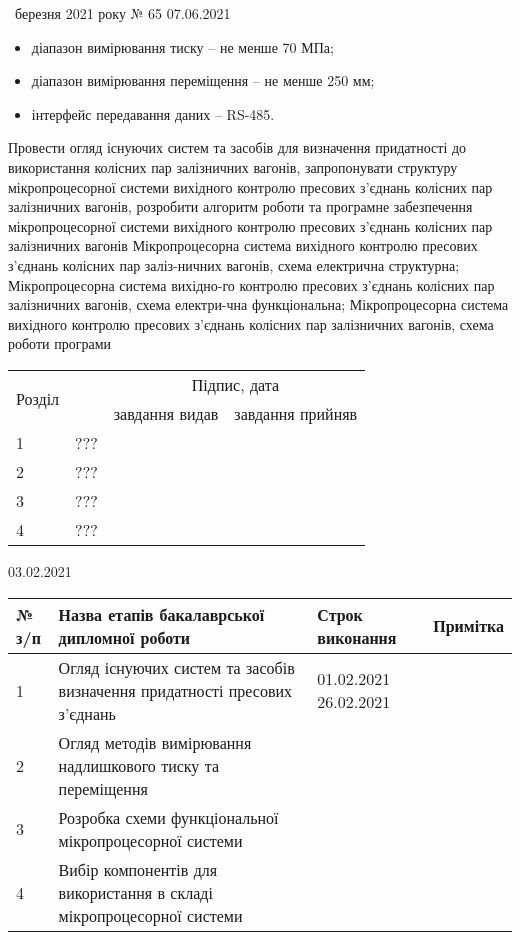 \begin{assignment}%
{\guillemotright~березня 2021 року № 65}
%
{07.06.2021}
%
{\begin{itemize}
\item {діапазон вимірювання тиску – не менше 70 МПа;}
\item {діапазон вимірювання переміщення – не менше 250 мм;}
\item {інтерфейс передавання даних – RS-485.}
\end{itemize}}
%
{Провести огляд існуючих систем та засобів для визначення придатності до використання колісних пар залізничних вагонів, запропонувати структуру мікропроцесорної системи вихідного контролю пресових з’єднань колісних пар залізничних вагонів, розробити алгоритм роботи та програмне забезпечення мікропроцесорної системи вихідного контролю пресових з’єднань колісних пар залізничних вагонів}
%
{Мікропроцесорна система вихідного контролю пресових з’єднань колісних пар заліз-ничних вагонів, схема електрична структурна; Мікропроцесорна система вихідно-го контролю пресових з’єднань колісних пар залізничних вагонів, схема електри-чна функціональна; Мікропроцесорна система вихідного контролю пресових з’єднань колісних пар залізничних вагонів, схема роботи програми}
%
{\begin{tabular}{|p{1.8cm}|p{8.4cm}|p{2.5cm}|p{2.5cm}|}\hline
  \multirow{2}{*}{Розділ} & \multirow{2}{*}{\parbox{8.4cm}{}} & \multicolumn{2}{c|}{Підпис, дата} \\ \cline{3-4}
  & & завдання видав & завдання прийняв \\ \hline
  1 & ??? &  &  \\ \hline 
  2 & ??? &  &  \\ \hline
  3 & ??? &  &  \\ \hline
  4 & ??? &  &  \\ \hline
\end{tabular}}
%
{03.02.2021}
%
{\begin{tabular}{|p{0.8cm}|p{9.0cm}|p{3.4cm}|p{2.0cm}|}\hline
  № з/п & Назва етапів бакалаврської дипломної роботи & Строк виконання & Примітка \\ \hline
  1 & Огляд існуючих систем та засобів визначення придатності  пресових з’єднань & 01.02.2021 26.02.2021 &  \\ \hline 
  2 & Огляд методів вимірювання надлишкового тиску та переміщення &  &  \\ \hline
  3 & Розробка схеми функціональної мікропроцесорної системи &  &  \\ \hline
  4 & Вибір компонентів для використання в складі мікропроцесорної  системи &  &  \\ \hline
\end{tabular}}
\end{assignment} 